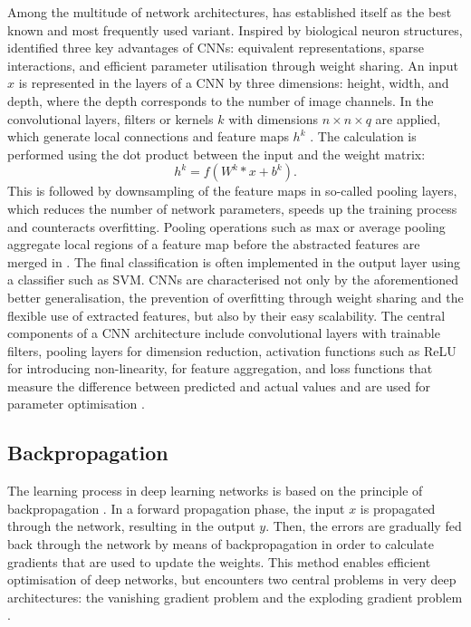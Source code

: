Among the multitude of network architectures,  has established itself as the best known and most frequently used variant. Inspired by biological neuron structures, \cite{Goodfellow-et-al-2016} identified three key advantages of CNNs: equivalent representations, sparse interactions, and efficient parameter utilisation through weight sharing. An input $x$ is represented in the layers of a CNN by three dimensions: height, width, and depth, where the depth corresponds to the number of image channels. In the convolutional layers, filters or kernels $k$ with dimensions $n \times n \times q$ are applied, which generate local connections and feature maps $h^k$ \cite{Alzubaidi2021}. The calculation is performed using the dot product between the input and the weight matrix:  
\begin {equation}
h^k = f(W^k \ast x + b^k).
\end {equation}
This is followed by downsampling of the feature maps in so-called pooling layers, which reduces the number of network parameters, speeds up the training process and counteracts overfitting. Pooling operations such as max or average pooling aggregate local regions of a feature map before the abstracted features are merged in . The final classification is often implemented in the output layer using a classifier such as \acrfull{SVM}. CNNs are characterised not only by the aforementioned better generalisation, the prevention of overfitting through weight sharing and the flexible use of extracted features, but also by their easy scalability. The central components of a \acrshort{CNN} architecture include convolutional layers with trainable filters, pooling layers for dimension reduction, activation functions such as \acrfull{ReLU} for introducing non-linearity,  for feature aggregation, and loss functions that measure the difference between predicted and actual values and are used for parameter optimisation \cite{Alzubaidi2021}.

\subsection{Backpropagation}

The learning process in deep learning networks is based on the principle of backpropagation \cite{Goodfellow-et-al-2016}. In a forward propagation phase, the input $x$ is propagated through the network, resulting in the output $y$. Then, the errors are gradually fed back through the network by means of backpropagation in order to calculate gradients that are used to update the weights. This method enables efficient optimisation of deep networks, but encounters two central problems in very deep architectures: the vanishing gradient problem and the exploding gradient problem \cite{Alzubaidi2021}.  

